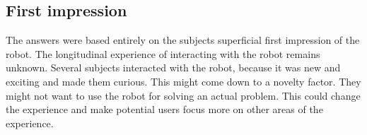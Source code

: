 \subsection{First impression}
The answers were based entirely on the subjects superficial first impression of the robot. The longitudinal experience of interacting with the robot remains unknown. Several subjects interacted with the robot, because it was new and exciting and made them curious. This might come down to a novelty factor. They might not want to use the robot for solving an actual problem. This could change the experience and make potential users focus more on other areas of the experience.